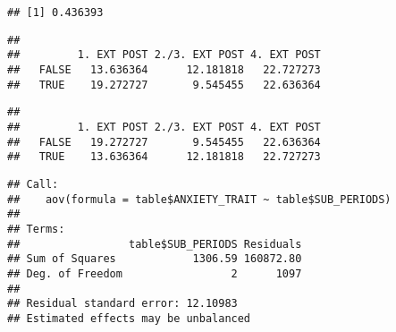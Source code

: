 \documentclass[
]{book}
\newenvironment{Shaded}{\begin{snugshade}}{\end{snugshade}}
\newcommand{\CommentTok}[1]{\textcolor[rgb]{0.56,0.35,0.01}{\textit{#1}}}
\newcommand{\DecValTok}[1]{\textcolor[rgb]{0.00,0.00,0.81}{#1}}
\newcommand{\FunctionTok}[1]{\textcolor[rgb]{0.00,0.00,0.00}{#1}}
\newcommand{\NormalTok}[1]{#1}
\newcommand{\OtherTok}[1]{\textcolor[rgb]{0.56,0.35,0.01}{#1}}
\newcommand{\SpecialCharTok}[1]{\textcolor[rgb]{0.00,0.00,0.00}{#1}}
\begin{document}
\begin{verbatim}
## [1] 0.436393
\end{verbatim}

\begin{Shaded}
\end{Shaded}

\begin{verbatim}
##        
##         1. EXT POST 2./3. EXT POST 4. EXT POST
##   FALSE   13.636364      12.181818   22.727273
##   TRUE    19.272727       9.545455   22.636364
\end{verbatim}

\begin{Shaded}
\end{Shaded}

\begin{verbatim}
##        
##         1. EXT POST 2./3. EXT POST 4. EXT POST
##   FALSE   19.272727       9.545455   22.636364
##   TRUE    13.636364      12.181818   22.727273
\end{verbatim}

\begin{Shaded}
\end{Shaded}

\begin{verbatim}
## Call:
##    aov(formula = table$ANXIETY_TRAIT ~ table$SUB_PERIODS)
## 
## Terms:
##                 table$SUB_PERIODS Residuals
## Sum of Squares            1306.59 160872.80
## Deg. of Freedom                 2      1097
## 
## Residual standard error: 12.10983
## Estimated effects may be unbalanced
\end{verbatim}
\end{document}
